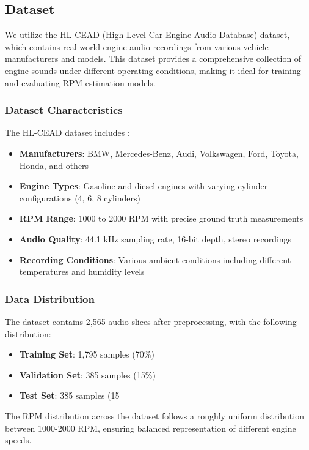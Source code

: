 \documentclass[journal,10pt]{IEEEtran}
\begin{document}
\subsection{Dataset}

We utilize the HL-CEAD (High-Level Car Engine Audio Database) dataset, which contains real-world engine audio recordings from various vehicle manufacturers and models. This dataset provides a comprehensive collection of engine sounds under different operating conditions, making it ideal for training and evaluating RPM estimation models.

\subsubsection{Dataset Characteristics}

The HL-CEAD dataset includes \cite{ZHONGGUO}:
\begin{itemize}
    \item \textbf{Manufacturers}: BMW, Mercedes-Benz, Audi, Volkswagen, Ford, Toyota, Honda, and others
    \item \textbf{Engine Types}: Gasoline and diesel engines with varying cylinder configurations (4, 6, 8 cylinders)
    \item \textbf{RPM Range}: 1000 to 2000 RPM with precise ground truth measurements
    \item \textbf{Audio Quality}: 44.1 kHz sampling rate, 16-bit depth, stereo recordings
    \item \textbf{Recording Conditions}: Various ambient conditions including different temperatures and humidity levels
\end{itemize}

\subsubsection{Data Distribution}

The dataset contains 2,565 audio slices after preprocessing, with the following distribution:
\begin{itemize}
    \item \textbf{Training Set}: 1,795 samples (70\%)
    \item \textbf{Validation Set}: 385 samples (15\%)
    \item \textbf{Test Set}: 385 samples (15%
\end{itemize}

The RPM distribution across the dataset follows a roughly uniform distribution between 1000-2000 RPM, ensuring balanced representation of different engine speeds.
\end{document}
